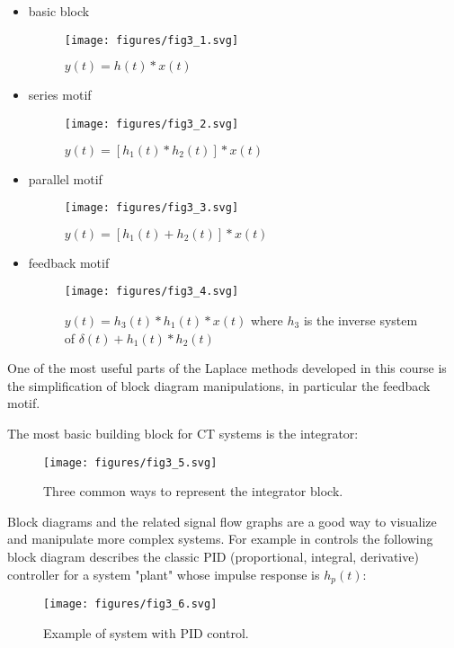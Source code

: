 \documentclass{article}
\begin{document}
\begin{itemize}
\item basic block
    \begin{figure}
    \centering
    \texttt{[image: figures/fig3\_1.svg]}
    \caption{$y(t) = h(t)*x(t)$}
  \end{figure}
  \item series motif
    \begin{figure}
    \centering
    \texttt{[image: figures/fig3\_2.svg]}
    \caption{$y(t) = [h_1(t)*h_2(t)]*x(t)$}
    \end{figure}
  \item parallel motif
    \begin{figure}
    \centering
    \texttt{[image: figures/fig3\_3.svg]}
    \caption{$y(t) = [h_1(t) + h_2(t)]*x(t)$}
    \end{figure}
  \item feedback motif
    \begin{figure}
      \centering
    \texttt{[image: figures/fig3\_4.svg]}
    \caption{$y(t) = h_3(t)*h_1(t)*x(t)$ where $h_3$ is the inverse system of $\delta(t) + h_1(t)*h_2(t)$}
    \end{figure}
\end{itemize}

One of the most useful parts of the Laplace methods developed in this course is the simplification of block diagram manipulations, in particular the feedback motif.

The most basic building block for CT systems is the integrator:

\begin{figure}
  \centering
  \texttt{[image: figures/fig3\_5.svg]}
  \caption{Three common ways to represent the integrator block.}
\end{figure}
    
Block diagrams and the related signal flow graphs are a good way to visualize and manipulate more complex systems. For example in controls the following block diagram describes the classic PID (proportional, integral, derivative) controller for a system "plant" whose impulse response is $h_p(t)$:

\begin{figure}
  \centering
  \texttt{[image: figures/fig3\_6.svg]}
  \caption{Example of system with PID control.}
\end{figure}
\end{document}
